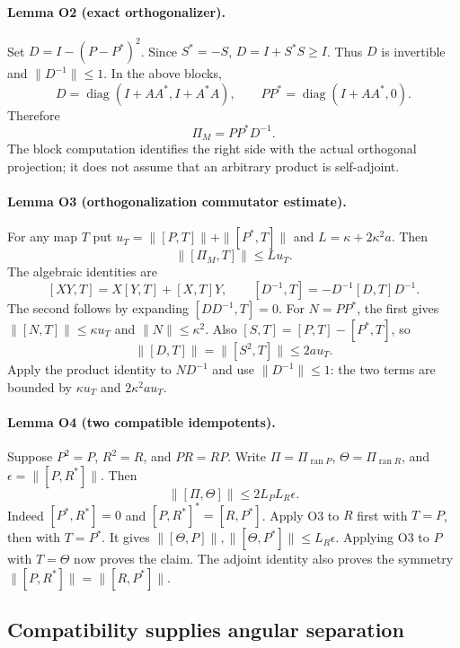 \paragraph{Lemma O2 (exact orthogonalizer).}
Set $D=I-(P-P^*)^2$. Since $S^*=-S$, $D=I+S^*S\geq I$.
Thus $D$ is invertible and $\|D^{-1}\|\leq1$. In the above blocks,
\[
 D=\operatorname{diag}(I+AA^*,I+A^*A),\qquad
 PP^*=\operatorname{diag}(I+AA^*,0).
\]
Therefore
\begin{equation}
 \Pi_M=PP^*D^{-1}.
 \label{urgent:orthogonalizer}
\end{equation}
The block computation identifies the right side with the actual orthogonal
projection; it does not assume that an arbitrary product is self-adjoint.

\paragraph{Lemma O3 (orthogonalization commutator estimate).}
For any map $T$ put $u_T=\|[P,T]\|+\|[P^*,T]\|$ and
$L=\kappa+2\kappa^2a$. Then
\begin{equation}
 \|[\Pi_M,T]\|\leq L u_T.
 \label{urgent:ortho-commutator}
\end{equation}
The algebraic identities are
\[
 [XY,T]=X[Y,T]+[X,T]Y,\qquad
 [D^{-1},T]=-D^{-1}[D,T]D^{-1}.
\]
The second follows by expanding $[DD^{-1},T]=0$.
For $N=PP^*$, the first gives
$\|[N,T]\|\leq\kappa u_T$ and $\|N\|\leq\kappa^2$.
Also $[S,T]=[P,T]-[P^*,T]$, so
\[
 \|[D,T]\|=\|[S^2,T]\|\leq2a u_T.
\]
Apply the product identity to $ND^{-1}$ and use $\|D^{-1}\|\leq1$:
the two terms are bounded by $\kappa u_T$ and $2\kappa^2a u_T$.

\paragraph{Lemma O4 (two compatible idempotents).}
Suppose $P^2=P$, $R^2=R$, and $PR=RP$. Write
$\Pi=\Pi_{\operatorname{ran}P}$, $\Theta=\Pi_{\operatorname{ran}R}$,
and $\epsilon=\|[P,R^*]\|$. Then
\begin{equation}
 \|[\Pi,\Theta]\|\leq2L_PL_R\epsilon.
 \label{urgent:double-commutator}
\end{equation}
Indeed $[P^*,R^*]=0$ and $[P,R^*]^*=[R,P^*]$.
Apply O3 to $R$ first with $T=P$, then with $T=P^*$.
It gives $\|[\Theta,P]\|,\|[\Theta,P^*]\|\leq L_R\epsilon$.
Applying O3 to $P$ with $T=\Theta$ now proves the claim.
The adjoint identity also proves the symmetry
$\|[P,R^*]\|=\|[R,P^*]\|$.

\subsection{Compatibility supplies angular separation}

